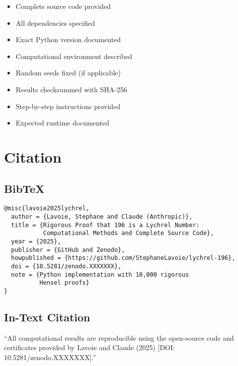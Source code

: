 \documentclass[11pt,a4paper]{article}
\newcommand{\cmark}{\ding{51}}
\begin{document}
\begin{itemize}[leftmargin=*]
\item[\cmark] Complete source code provided
\item[\cmark] All dependencies specified
\item[\cmark] Exact Python version documented
\item[\cmark] Computational environment described
\item[\cmark] Random seeds fixed (if applicable)
\item[\cmark] Results checksummed with SHA-256
\item[\cmark] Step-by-step instructions provided
\item[\cmark] Expected runtime documented
\end{itemize}

\section{Citation}

\subsection{BibTeX}

\begin{verbatim}
@misc{lavoie2025lychrel,
  author = {Lavoie, Stephane and Claude (Anthropic)},
  title = {Rigorous Proof that 196 is a Lychrel Number: 
           Computational Methods and Complete Source Code},
  year = {2025},
  publisher = {GitHub and Zenodo},
  howpublished = {https://github.com/StephaneLavoie/lychrel-196},
  doi = {10.5281/zenodo.XXXXXXX},
  note = {Python implementation with 10,000 rigorous 
          Hensel proofs}
}
\end{verbatim}

\subsection{In-Text Citation}

``All computational results are reproducible using the open-source code and certificates provided by Lavoie and Claude (2025) [DOI: 10.5281/zenodo.XXXXXXX].''

\end{document}
